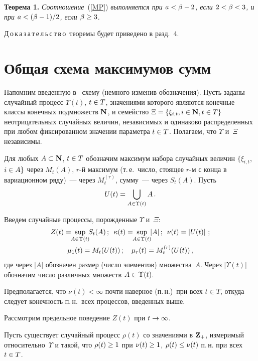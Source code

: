 \begin{multicols}{2}
\smallskip

\noindent
\textbf{Теорема 1.} \textit{Соотношение}~(\ref{MP}) \textit{выполняется при
    $a\hm<\beta-2$, если $2\hm<\beta\hm<3$, и при $a\hm<(\beta-1)/2$,
    если $\beta\hm\ge 3$.}

    
    \smallskip
    
    \noindent
    Д\,о\,к\,а\,з\,а\,т\,е\,л\,ь\,с\,т\,в\,о\ теоремы будет приведено в разд.~4.

    
    \section{Общая схема максимумов сумм}

    Напомним введенную в~\cite{Leb1} схему (немного изменив обозначения).
    Пусть заданы случайный процесс $\Upsilon(t)$, $t\hm\in T$,
    значениями которого являются конечные
    классы конечных подмножеств ${\bf N}$,
    и семейство $\Xi\hm=\{\xi_{i,t},i\in {\bf N},t\in T\}$
    неотрицательных случайных величин, независимых и одинаково распределенных
    при любом фиксированном значении параметра $t\hm\in T$.
    Полагаем, что $\Upsilon$ и~$\Xi$ независимы.

    Для любых $A\subset {\bf N}$, $t\hm\in T$
    обозначим максимум набора случайных величин $\{\xi_{i,t}$, $i\hm\in A\}$
    через $M_t(A)$, $r$-й максимум (т.\,е.\ чис\-ло, стоящее $r$-м с конца в
    вариационном ряду)~--- через $M_t^{(r)}$, сумму~--- через $S_t(A)$.
    Пусть 
    $$
    U(t)\hm=\bigcup\limits_{A\in\Upsilon(t)}A\,.
    $$

    Введем случайные процессы, порожденные $\Upsilon$ и~$\Xi$:
    \begin{gather*}
    Z(t)=\!\!\sup\limits_{A\in\Upsilon(t)}\!\!S_t(A)\,;\enskip
    \kappa(t)=\!\!\sup\limits_{A\in\Upsilon(t)}\!\!|A|\,;
    \enskip\nu(t)=\left|U(t)\right|\,;\\
    \mu_1(t)=M_t(U(t))\,;\quad \mu_r(t)=M_t^{(r)}(U(t))\,,
 \end{gather*}
    где через $|A|$ обозначен размер (число элементов) множества~$A$.
    Через $|\Upsilon(t)|$ обозначим число различных множеств $A\hm\in\Upsilon(t)$.

    Предполагается, что $\nu(t)<\infty$ почти наверное (п.\,н.)\
    при всех $t\in T$, откуда следует конечность п.\,н.\
    всех процессов, введенных выше.

    Рассмотрим предельное поведение $Z(t)$ при $t\hm\to\infty$.

    Пусть существует случайный процесс $\rho(t)$ со
    значениями в ${\bf Z}_+$, измеримый относительно~$\Upsilon$ и такой, что
    $\rho(t)\hm\ge 1$ при $\nu(t)\hm\ge 1$, $\rho(t)\hm\le\nu(t)$ п.\,н. при всех $t\hm\in T$.


\end{multicols}
